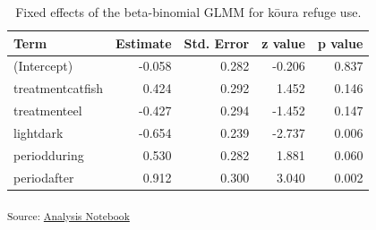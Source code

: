 \documentclass[
  letterpaper,
  DIV=11,
  numbers=noendperiod]{scrartcl}
\begin{document}
{

\begin{longtable}[]{@{}lrrrr@{}}

\caption{\label{tbl-1-fixed-effects}Fixed effects of the beta-binomial
GLMM for kōura refuge use.}

\tabularnewline

\toprule\noalign{}
Term & Estimate & Std. Error & z value & p value \\
\midrule\noalign{}
\endhead
\bottomrule\noalign{}
\endlastfoot
(Intercept) & -0.058 & 0.282 & -0.206 & 0.837 \\
treatmentcatfish & 0.424 & 0.292 & 1.452 & 0.146 \\
treatmenteel & -0.427 & 0.294 & -1.452 & 0.147 \\
lightdark & -0.654 & 0.239 & -2.737 & 0.006 \\
periodduring & 0.530 & 0.282 & 1.881 & 0.060 \\
periodafter & 0.912 & 0.300 & 3.040 & 0.002 \\

\end{longtable}

}

\textsubscript{Source:
\href{https://OlivierRaven.github.io/https---github.com-OlivierRaven-NCE_Koura_catfish/analysis-preview.html\#cell-tbl-1-fixed-effects}{Analysis
Notebook}}
\end{document}
